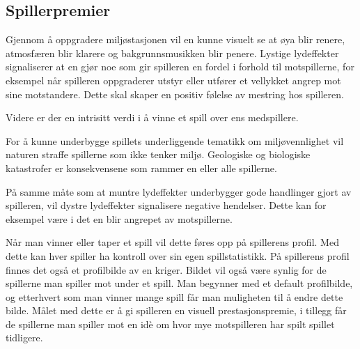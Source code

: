 
\subsection{Spillerpremier}

Gjennom å oppgradere miljøstasjonen vil en kunne visuelt se at øya blir renere, atmosfæren blir klarere og bakgrunnsmusikken blir penere. Lystige lydeffekter signaliserer at en gjør noe som gir spilleren en fordel i forhold til motspillerne, for eksempel når spilleren oppgraderer utstyr eller utfører et vellykket angrep mot sine motstandere. Dette skal skaper en positiv følelse av mestring hos spilleren. 

Videre er der en intrisitt verdi i å vinne et spill over ens medspillere.

For å kunne underbygge spillets underliggende tematikk om miljøvennlighet vil naturen straffe spillerne som ikke tenker miljø. Geologiske og biologiske katastrofer er konsekvensene som rammer en eller alle spillerne.

På samme måte som at muntre lydeffekter underbygger gode handlinger gjort av spilleren, vil dystre lydeffekter signalisere negative hendelser. Dette kan for eksempel være i det en blir angrepet av motspillerne. 

Når man vinner eller taper et spill vil dette føres opp på spillerens profil. Med dette kan hver spiller ha kontroll over sin egen spillstatistikk. På spillerens profil finnes det også et profilbilde av en kriger. Bildet vil også være synlig for de spillerne man spiller mot under et spill. Man begynner med et default profilbilde, og etterhvert som man vinner mange spill får man muligheten til å endre dette bilde. Målet med dette er å gi spilleren en visuell prestasjonspremie, i tillegg får de spillerne man spiller mot en idè om hvor mye motspilleren har spilt spillet tidligere.